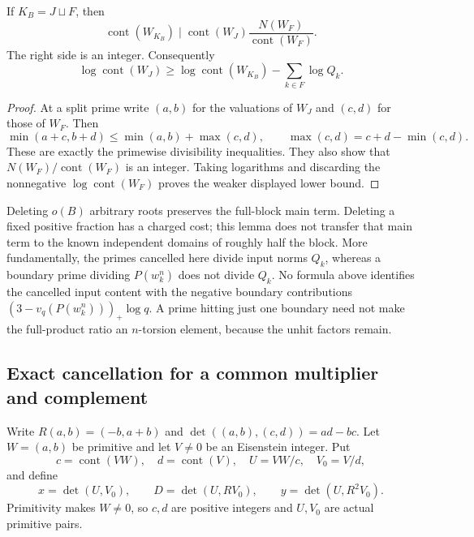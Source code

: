 \begin{lemma}
\label{cc-deletion}
If \(K_B=J\sqcup F\), then
\[
 \operatorname{cont}(W_{K_B})\mid
 \operatorname{cont}(W_J)\frac{N(W_F)}{\operatorname{cont}(W_F)}.
\]
The right side is an integer. Consequently
\[
 \log\operatorname{cont}(W_J)
 \ge\log\operatorname{cont}(W_{K_B})-\sum_{k\in F}\log Q_k.
\]
\end{lemma}
\begin{proof}
At a split prime write \((a,b)\) for the valuations of \(W_J\) and
\((c,d)\) for those of \(W_F\). Then
\[
 \min(a+c,b+d)\le\min(a,b)+\max(c,d),
 \qquad \max(c,d)=c+d-\min(c,d).
\]
These are exactly the primewise divisibility inequalities. They also
show that \(N(W_F)/\operatorname{cont}(W_F)\) is an integer. Taking
logarithms and discarding the nonnegative \(\log\operatorname{cont}(W_F)\)
proves the weaker displayed lower bound.
\end{proof}

Deleting \(o(B)\) arbitrary roots preserves the full-block main term.
Deleting a fixed positive fraction has a charged cost; this lemma does
not transfer that main term to the known independent domains of roughly
half the block. More fundamentally, the primes cancelled here divide
input norms \(Q_k\), whereas a boundary prime dividing
\(P(w_k^n)\) does not divide \(Q_k\). No formula above identifies the
cancelled input content with the negative boundary contributions
\((3-v_q(P(w_k^n)))_+\log q\). A prime hitting just one boundary need
not make the full-product ratio an \(n\)-torsion element, because the
unhit factors remain.

\subsection{Exact cancellation for a common multiplier and complement}

Write \(R(a,b)=(-b,a+b)\) and
\(\det((a,b),(c,d))=ad-bc\). Let \(W=(a,b)\) be primitive and let
\(V\ne0\) be an Eisenstein integer. Put
\[
 c=\operatorname{cont}(VW),\quad d=\operatorname{cont}(V),\quad
 U=VW/c,\quad V_0=V/d,
\]
and define
\[
 x=\det(U,V_0),\qquad D=\det(U,RV_0),\qquad
 y=\det(U,R^2V_0).
\]
Primitivity makes \(W\ne0\), so \(c,d\) are positive integers and
\(U,V_0\) are actual primitive pairs.

